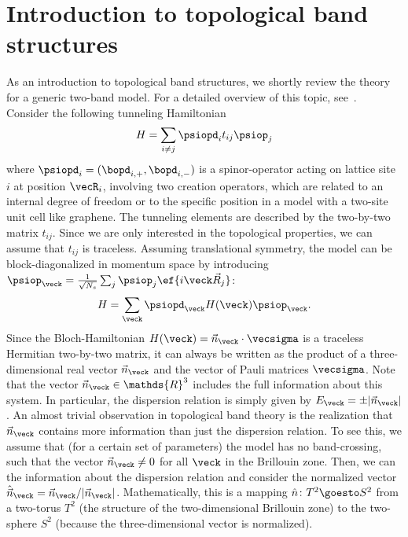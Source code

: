 \section{Introduction to topological band structures}

As an introduction to topological band structures, we shortly review the theory for a generic two-band model.
For a detailed overview of this topic, see~.
Consider the following tunneling Hamiltonian
\begin{align}
    H = \sum_{i\ne j} \psiopd_i t_{ij} \psiop_j
\end{align}
where $\psiopd_i = (\bopd_{i,+}, \bopd_{i,-})$ is a spinor-operator acting on lattice site $i$ at position $\vecR_i$, involving two creation operators, which are related to an internal degree of freedom or to the specific position in a model with a two-site unit cell like graphene.
The tunneling elements are described by the two-by-two matrix $t_{ij}$.
Since we are only interested in the topological properties, we can assume that $t_{ij}$ is traceless.
Assuming translational symmetry, the model can be block-diagonalized in momentum space by introducing $\psiop_{\veck}=\frac{1}{\sqrt{N_s}}\sum_{j} \psiop_{j}\ef{i\veck\vec{R}_j}$:
\begin{align}
    H=\sum_\veck \psiopd_{\veck} H(\veck) \psiop_{\veck}.
\end{align}
Since the Bloch-Hamiltonian $H(\veck) = \vec{n}_\veck \cdot \vecsigma$ is a traceless Hermitian two-by-two matrix, it can always be written as the product of a three-dimensional real vector $\vec{n}_{\veck}$ and the vector of Pauli matrices $\vecsigma$.
Note that the vector $\vec{n}_\veck \in \mathds{R}^3$ includes the full information about this system.
In particular, the dispersion relation is simply given by $E_\veck = \pm |\vec{n}_\veck|$.
An almost trivial observation in topological band theory is the realization that $\vec{n}_\veck$ contains more information than just the dispersion relation.
To see this, we assume that (for a certain set of parameters) the model has no band-crossing, such that the vector $\vec{n}_\veck \ne 0$ for all $\veck$ in the Brillouin zone.
Then, we can  the information about the dispersion relation and consider the normalized vector $\hat{\vec{n}}_\veck = \vec{n}_\veck/|\vec{n}_\veck|$.
Mathematically, this is a mapping $\hat{n}\colon T^2 \goesto S^2$ from a two-torus $T^2$ (the structure of the two-dimensional Brillouin zone) to the two-sphere $S^2$ (because the three-dimensional vector is normalized).
